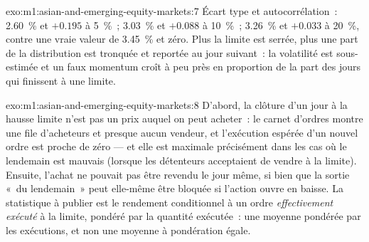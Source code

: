 \begin{solution}{exo:m1:asian-and-emerging-equity-markets:7}
Écart type et autocorrélation~: 2.60~\% et $+0.195$ à 5~\%~; 3.03~\%
et $+0.088$ à 10~\%~; 3.26~\% et $+0.033$ à 20~\%, contre une vraie valeur de 3.45~\% et
zéro. Plus la limite est serrée, plus une part de la distribution est tronquée et reportée
au jour suivant~: la volatilité est sous-estimée et un faux momentum croît à peu près
en proportion de la part des jours qui finissent à une limite.
\end{solution}

\begin{solution}{exo:m1:asian-and-emerging-equity-markets:8}
D'abord, la clôture d'un jour à la hausse limite n'est pas un prix auquel on
peut acheter~: le carnet d'ordres montre une file d'acheteurs et presque aucun
vendeur, et l'exécution espérée d'un nouvel ordre est proche de zéro --- et
elle est maximale précisément dans les cas où le lendemain est mauvais
(lorsque les détenteurs acceptaient de vendre à la limite). Ensuite, l'achat
ne pouvait pas être revendu le jour même, si bien que la sortie «~du lendemain~»
peut elle-même être bloquée si l'action ouvre en baisse. La statistique à publier
est le rendement conditionnel à un ordre \emph{effectivement exécuté} à la limite,
pondéré par la quantité exécutée~: une moyenne pondérée par les exécutions, et non une moyenne à pondération égale.
\end{solution}

